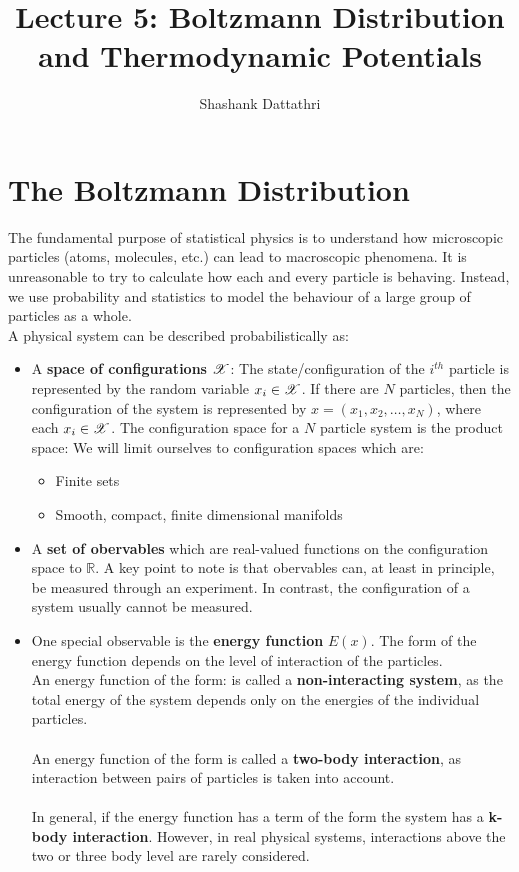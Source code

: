 \documentclass[letterpaper,english,12pt]{article}
\title{Lecture 5: Boltzmann Distribution and Thermodynamic Potentials}
\author{Shashank Dattathri}
\begin{document}
\maketitle
\section{The Boltzmann Distribution}
The fundamental purpose of statistical physics is to understand how microscopic particles (atoms, molecules, etc.) can lead to macroscopic phenomena. It is unreasonable to try to calculate how each and every particle is behaving. Instead, we use probability and statistics to model the behaviour of a large group of particles as a whole.\\
A physical system can be described probabilistically as: 
\begin{itemize}
\item A \textbf{space of configurations $\mathscr{X}$}: The state/configuration of the $i^{th}$ particle is represented by the random variable $x_i \in \mathscr{X}$. If there are $N$ particles, then the configuration of the system is represented by $x=\left(x_1, x_2,\ldots ,x_N \right)$, where each $x_i \in \mathscr{X}$. The configuration space for a $N$ particle system is the product space: 
We will limit ourselves to configuration spaces which are: 
\begin{itemize}
\item Finite sets
\item Smooth, compact, finite dimensional manifolds
\end{itemize}
\item A \textbf{set of obervables} which are real-valued functions on the configuration space to $\mathbb{R}$. 
A key point to note is that obervables can, at least in principle, be measured through an experiment. In contrast, the configuration of a system usually cannot be measured. 
\item One special observable is the \textbf{energy function} $E(x)$. The form of the energy function depends on the level of interaction of the particles. \\
An energy function of the form: 
 is called a \textbf{non-interacting system}, as the total energy of the system depends only on the energies of the individual particles. \\\\
An energy function of the form   is called a \textbf{two-body interaction}, as interaction between pairs of particles is taken into account. \\\\
In general, if the energy function has a term of the form  the system has a \textbf{k-body interaction}. However, in real physical systems, interactions above the two or three body level are rarely considered. 
\end{itemize}
\end{document}

